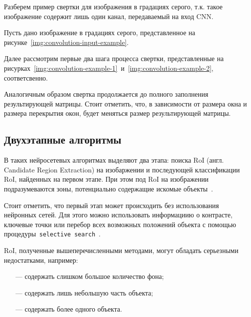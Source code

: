Разберем пример свертки для изображения в градациях серого, т.к. такое изображение содержит лишь один канал, передаваемый на вход CNN.

Пусть дано изображение в градациях серого, представленное на рисунке~\ref{img:convolution-input-example}.


Далее рассмотрим первые два шага процесса свертки, представленные на рисурках~\ref{img:convolution-example-1}~и~\ref{img:convolution-example-2}, соответсвенно.



Аналогичным образом свертка продолжается до полного заполнения результирующей матрицы. Стоит отметить, что, в зависимости от размера окна и размера перекрытия окон, будет меняться размер результирующей матрицы.

\subsection{Двухэтапные алгоритмы}

В таких нейросетевых алгоритмах выделяют два этапа: поиска RoI (англ. Candidate Region Extraction) на изобаржении и последующей классификации RoI, найденных на первом этапе. При этом под RoI на изображении подразумеваются зоны, потенциально содержащие искомые объекты~\cite{overview-of-two-stage-object-detection}. 



Стоит отметить, что первый этап может происходить без использования нейронных сетей. Для этого можно использовать информациию о контрасте, ключевые точки или перебор всех возможных положений объекта с помощью процедуры~\texttt{selective search}~\cite{realtime-recognition-algorythm}.

RoI, полученные вышеперечисленными методами, могут обладать серьезными недостатками, например:
\begin{itemize}
    \item[---] содержать слишком большое количество фона;
    \item[---] содержать лишь небольшую часть объекта;
    \item[---] содержать более одного объекта.
\end{itemize}

